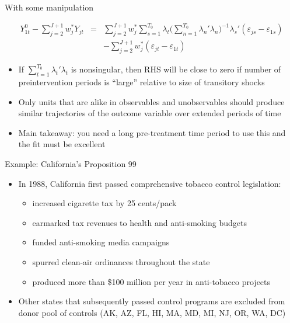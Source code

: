 \documentclass{beamer}
\begin{document}
\begin{frame}{With some manipulation}

\begin{eqnarray*}
Y^0_{1t} - \sum^{J+1}_{j=2}w^*_jY_{jt} &=& \sum_{j=2}^{J+1} w_j^* \sum_{s=1}^{T_0} \lambda_t \bigg ( \sum_{n=1}^{T_0} \lambda_n'\lambda_n \bigg )
^{-1} \lambda_s'(\varepsilon_{js} - \varepsilon_{1s} ) \\
&& - \sum_{j=2}^{J+1} w_j^* (\varepsilon_{jt} - \varepsilon_{1t})
\end{eqnarray*}

\begin{itemize}
\item If $\sum_{t=1}^{T_0} \lambda_t' \lambda_t$ is nonsingular, then RHS will be close to zero if number of preintervention periods is ``large''  relative to size of transitory shocks 
\item Only units that are alike in observables and unobservables should produce similar trajectories of the outcome variable over extended periods of time
\item Main takeaway: you need a long pre-treatment time period to use this and the fit must be excellent
\end{itemize}


\end{frame}


\begin{frame}{Example: California's Proposition 99}
	
	\begin{itemize}
	\item In 1988, California first passed comprehensive tobacco control legislation:
		\begin{itemize}
		\item increased cigarette tax by 25 cents/pack
		\item earmarked tax revenues to health and anti-smoking budgets
		\item funded anti-smoking media campaigns
		\item spurred clean-air ordinances throughout the state
		\item produced more than \$100 million per year in anti-tobacco projects
		\end{itemize}
	\item Other states that subsequently passed control programs are excluded from donor pool of controls (AK, AZ, FL, HI, MA, MD, MI, NJ, OR, WA, DC)
	\end{itemize}
\end{frame}
\end{document}
